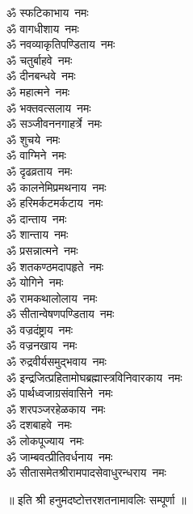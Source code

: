 \begin{multicols}{2}
\begin{flushleft}
ॐ स्फटिकाभाय~नमः\\
ॐ वागधीशाय~नमः\hfill{}\\
ॐ नवव्याकृतिपण्डिताय~नमः\\
ॐ चतुर्बाहवे~नमः\\
ॐ दीनबन्धवे~नमः\\
ॐ महात्मने~नमः\\
ॐ भक्तवत्सलाय~नमः\\
ॐ सञ्जीवननगाहर्त्रे~नमः\\
ॐ शुचये~नमः\\
ॐ वाग्मिने~नमः\\
ॐ दृढव्रताय~नमः\\
ॐ कालनेमिप्रमथनाय~नमः\hfill{}\\
ॐ हरिमर्कटमर्कटाय~नमः\\
ॐ दान्ताय~नमः\\
ॐ शान्ताय~नमः\\
ॐ प्रसन्नात्मने~नमः\\
ॐ शतकण्ठमदापहृते~नमः\\
ॐ योगिने~नमः\\
ॐ रामकथालोलाय~नमः\\
ॐ सीतान्वेषणपण्डिताय~नमः\\
ॐ वज्रदंष्ट्राय~नमः\\
ॐ वज्रनखाय~नमः\hfill{}\\
ॐ रुद्रवीर्यसमुद्भवाय~नमः\\
ॐ इन्द्रजित्प्रहितामोघ\-ब्रह्मास्त्रविनिवारकाय~नमः\\
ॐ पार्थध्वजाग्रसंवासिने~नमः\\
ॐ शरपञ्जरहेळकाय~नमः\\
ॐ दशबाहवे~नमः\\
ॐ लोकपूज्याय~नमः\\
ॐ जाम्बवत्प्रीतिवर्धनाय~नमः\\
ॐ सीतासमेतश्रीराम\-पादसेवाधुरन्धराय~नमः\\
\end{flushleft}
\end{multicols}
\centerline{॥ इति श्री हनुमदष्टोत्तरशतनामावलिः सम्पूर्णा ॥}
